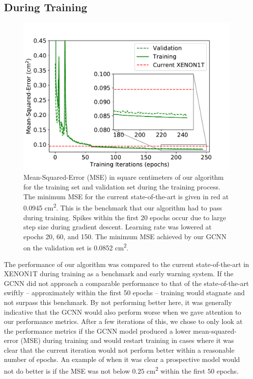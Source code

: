 \documentclass[../thesis.tex]{subfiles}
\begin{document}
\subsection{During Training}\label{subsec:Train}
\begin{figure}[ht]
	\centering
	\includegraphics[width=0.8\linewidth]{figures/del_mse-v-epo_insetted.pdf}
	\caption{Mean-Squared-Error (MSE) in square centimeters of our algorithm for the training set and validation set during the training process.
	The minimum MSE for the current state-of-the-art is given in red at 0.0945 cm\textsuperscript{2}.
	This is the benchmark that our algorithm  had to pass during training.
	Spikes within the first 20 epochs occur due to large step size during gradient descent.
	Learning rate was lowered at epochs 20, 60, and 150.
	The minimum MSE achieved by our GCNN on the validation set is 0.0852 cm\textsuperscript{2}.}
	\label{fig:GCNN_Training}
\end{figure}
The performance of our algorithm was compared to the current state-of-the-art in XENON1T during training as a benchmark and early warning system.
If the GCNN did not approach a comparable performance to that of the state-of-the-art swiftly -- approximately within the first 50 epochs -- training would stagnate and not surpass this benchmark.
By not performing better here, it was generally indicative that the GCNN would also perform worse when we gave attention to our performance metrics.
After a few iterations of this, we chose to only look at the performance metrics if the GCNN model produced a lower mean-squared-error (MSE) during training and would restart training in cases where it was clear that the current iteration would not perform better within a reasonable number of epochs.
An example of when it was clear a prospective model would not do better is if the MSE was not below $0.25$ cm\textsuperscript{2} within the first $50$ epochs.
\end{document}
